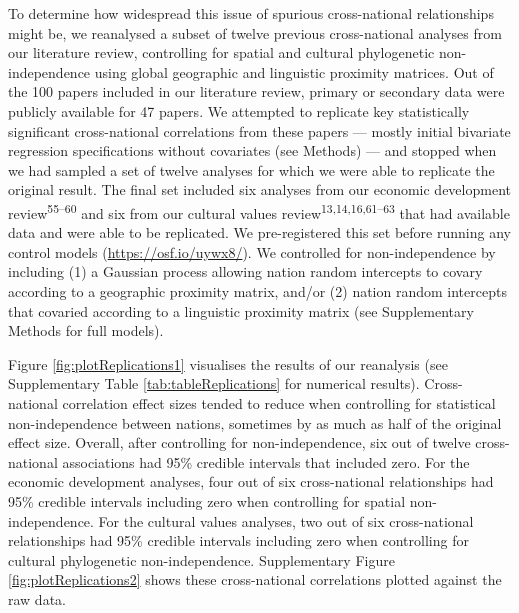 \documentclass[
  man,floatsintext]{apa6}
\begin{document}
To determine how widespread this issue of spurious cross-national relationships might be, we reanalysed a subset of twelve previous cross-national analyses from our literature review, controlling for spatial and cultural phylogenetic non-independence using global geographic and linguistic proximity matrices. Out of the 100 papers included in our literature review, primary or secondary data were publicly available for 47 papers. We attempted to replicate key statistically significant cross-national correlations from these papers --- mostly initial bivariate regression specifications without covariates (see Methods) --- and stopped when we had sampled a set of twelve analyses for which we were able to replicate the original result. The final set included six analyses from our economic development review\textsuperscript{55--60} and six from our cultural values review\textsuperscript{13,14,16,61--63} that had available data and were able to be replicated. We pre-registered this set before running any control models (\url{https://osf.io/uywx8/}). We controlled for non-independence by including (1) a Gaussian process allowing nation random intercepts to covary according to a geographic proximity matrix, and/or (2) nation random intercepts that covaried according to a linguistic proximity matrix (see Supplementary Methods for full models).

Figure \ref{fig:plotReplications1} visualises the results of our reanalysis (see Supplementary Table \ref{tab:tableReplications} for numerical results). Cross-national correlation effect sizes tended to reduce when controlling for statistical non-independence between nations, sometimes by as much as half of the original effect size. Overall, after controlling for non-independence, six out of twelve cross-national associations had 95\% credible intervals that included zero. For the economic development analyses, four out of six cross-national relationships had 95\% credible intervals including zero when controlling for spatial non-independence. For the cultural values analyses, two out of six cross-national relationships had 95\% credible intervals including zero when controlling for cultural phylogenetic non-independence. Supplementary Figure \ref{fig:plotReplications2} shows these cross-national correlations plotted against the raw data.
\end{document}
